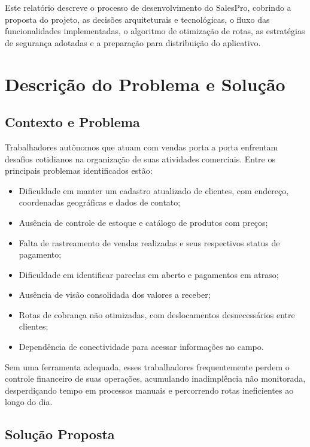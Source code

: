 \documentclass[
	12pt,				%
	oneside,			%
	a4paper,			%
	english,			%
	brazil				%
	]{abntex2}
\begin{document}
Este relatório descreve o processo de desenvolvimento do SalesPro, cobrindo a proposta do projeto, as decisões arquiteturais e tecnológicas, o fluxo das funcionalidades implementadas, o algoritmo de otimização de rotas, as estratégias de segurança adotadas e a preparação para distribuição do aplicativo.

\chapter{Descrição do Problema e Solução}

\section{Contexto e Problema}

Trabalhadores autônomos que atuam com vendas porta a porta enfrentam desafios cotidianos na organização de suas atividades comerciais. Entre os principais problemas identificados estão:

\begin{itemize}
  \item Dificuldade em manter um cadastro atualizado de clientes, com endereço, coordenadas geográficas e dados de contato;
  \item Ausência de controle de estoque e catálogo de produtos com preços;
  \item Falta de rastreamento de vendas realizadas e seus respectivos status de pagamento;
  \item Dificuldade em identificar parcelas em aberto e pagamentos em atraso;
  \item Ausência de visão consolidada dos valores a receber;
  \item Rotas de cobrança não otimizadas, com deslocamentos desnecessários entre clientes;
  \item Dependência de conectividade para acessar informações no campo.
\end{itemize}

Sem uma ferramenta adequada, esses trabalhadores frequentemente perdem o controle financeiro de suas operações, acumulando inadimplência não monitorada, desperdiçando tempo em processos manuais e percorrendo rotas ineficientes ao longo do dia.

\section{Solução Proposta}
\end{document}
